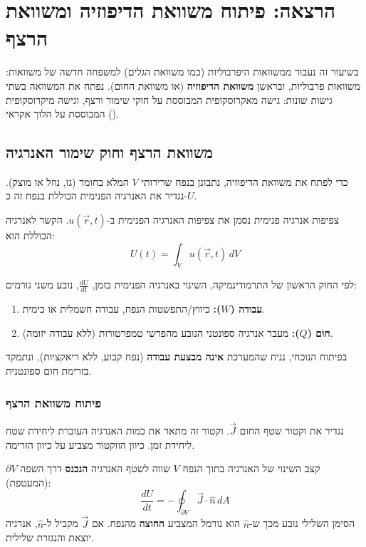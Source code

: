 \section{הרצאה: פיתוח משוואת הדיפוזיה ומשוואת הרצף}

בשיעור זה נעבור ממשוואות היפרבוליות (כמו משוואת הגלים) למשפחה חדשה של משוואות: משוואות פרבוליות, ובראשן \textbf{משוואת הדיפוזיה} (או משוואת החום). נפתח את המשוואה בשתי גישות שונות: גישה מאקרוסקופית המבוססת על חוקי שימור ורצף, וגישה מיקרוסקופית המבוססת על הלוך אקראי ().

\subsection{משוואת הרצף וחוק שימור האנרגיה}

כדי לפתח את משוואת הדיפוזיה, נתבונן בנפח שרירותי $V$ המלא בחומר (גז, נוזל או מוצק). נגדיר את האנרגיה הפנימית הכוללת בנפח זה כ-$U$.

\begin{definitionbox}{צפיפות אנרגיה פנימית}
נסמן את צפיפות האנרגיה הפנימית ב-$u(\vec{r},t)$. הקשר לאנרגיה הכוללת הוא:
\[
U(t) = \int_V u(\vec{r},t) \, dV
\]
\end{definitionbox}

לפי החוק הראשון של התרמודינמיקה, השינוי באנרגיה הפנימית בזמן, $\frac{dU}{dt}$, נובע משני גורמים:
\begin{enumerate}
    \item \textbf{עבודה ($W$):} כיווץ/התפשטות הנפח, עבודה חשמלית או כימית.
    \item \textbf{חום ($Q$):} מעבר אנרגיה ספונטני הנובע מהפרשי טמפרטורות (ללא עבודה יזומה).
\end{enumerate}

בפיתוח הנוכחי, נניח שהמערכת \textbf{אינה מבצעת עבודה} (נפח קבוע, ללא ריאקציות), ונתמקד בזרימת חום ספונטנית.

\subsubsection{פיתוח משוואת הרצף}
נגדיר את וקטור שטף החום $\vec{J}$. וקטור זה מתאר את כמות האנרגיה העוברת ליחידת שטח ליחידת זמן. כיוון הווקטור מצביע על כיוון הזרימה.

קצב השינוי של האנרגיה בתוך הנפח $V$ שווה לשטף האנרגיה \textbf{הנכנס} דרך השפה $\partial V$ (המעטפת):
\[
\frac{dU}{dt} = -\oint_{\partial V} \vec{J} \cdot \hat{n} \, dA
\]
הסימן השלילי נובע מכך ש-$\hat{n}$ הוא נורמל המצביע \textbf{החוצה} מהנפח. אם $\vec{J}$ מקביל ל-$\hat{n}$, אנרגיה יוצאת והנגזרת שלילית.

